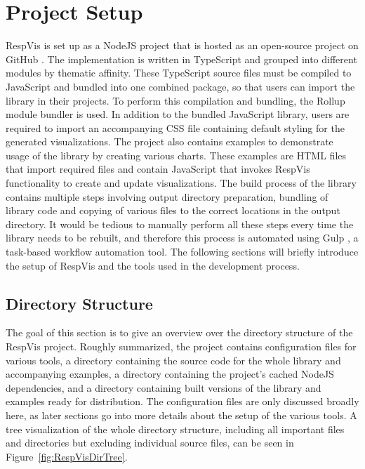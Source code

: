 
\section{Project Setup}
\label{sec:ProjectSetup}

RespVis is set up as a NodeJS \parencite{NodeJS} project that is hosted as an open-source project on GitHub \parencite{RespVisGitHub}.
The implementation is written in TypeScript and grouped into different modules by thematic affinity. 
These TypeScript source files must be compiled to JavaScript and bundled into one combined package, so that users can import the library in their projects.
To perform this compilation and bundling, the Rollup module bundler \parencite{Rollup} is used.
In addition to the bundled JavaScript library, users are required to import an accompanying CSS file containing default styling for the generated visualizations.
The project also contains examples to demonstrate usage of the library by creating various charts.
These examples are HTML files that import required files and contain JavaScript that invokes RespVis functionality to create and update visualizations.
The build process of the library contains multiple steps involving output directory preparation, bundling of library code and copying of various files to the correct locations in the output directory.
It would be tedious to manually perform all these steps every time the library needs to be rebuilt, and therefore this process is automated using Gulp \parencite{Gulp}, a task-based workflow automation tool.
The following sections will briefly introduce the setup of RespVis and the tools used in the development process.  

\subsection{Directory Structure}

The goal of this section is to give an overview over the directory structure of the RespVis project.
Roughly summarized, the project contains configuration files for various tools, a  directory containing the source code for the whole library and accompanying examples, a  directory containing the project's cached NodeJS dependencies, and a  directory containing built versions of the library and examples ready for distribution.
The configuration files are only discussed broadly here, as later sections go into more details about the setup of the various tools.
A tree visualization of the whole directory structure, including all important files and directories but excluding individual source files, can be seen in Figure~\ref{fig:RespVisDirTree}.

